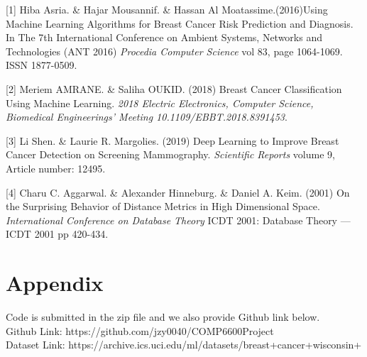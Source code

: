 \documentclass{article} %
\begin{document}
\small{

[1] Hiba Asria. \& Hajar Mousannif. \& Hassan Al Moatassime.(2016)Using Machine Learning Algorithms for Breast Cancer Risk Prediction and Diagnosis. In The 7th International Conference on Ambient Systems, Networks and Technologies (ANT 2016) {\it Procedia Computer Science} vol 83, page 1064-1069. ISSN 1877-0509.


[2] Meriem AMRANE. \& Saliha OUKID. (2018) Breast Cancer Classification Using Machine Learning. {\it 2018 Electric Electronics, Computer Science, Biomedical Engineerings' Meeting 10.1109/EBBT.2018.8391453}.

[3] Li Shen. \& Laurie R. Margolies. (2019) Deep Learning to Improve Breast
Cancer Detection on Screening Mammography. {\it Scientific Reports} volume 9, Article number: 12495.

[4] Charu C. Aggarwal. \& Alexander Hinneburg. \& Daniel A. Keim. (2001) On the Surprising Behavior of Distance Metrics in High Dimensional Space. {\it International Conference on Database Theory} ICDT 2001: Database Theory — ICDT 2001 pp 420-434.
}


\section{Appendix}
\small{
Code is submitted in the zip file and we also provide Github link below.\\
Github Link: https://github.com/jzy0040/COMP6600Project\\
Dataset Link: https://archive.ics.uci.edu/ml/datasets/breast+cancer+wisconsin+%
}
\end{document}
